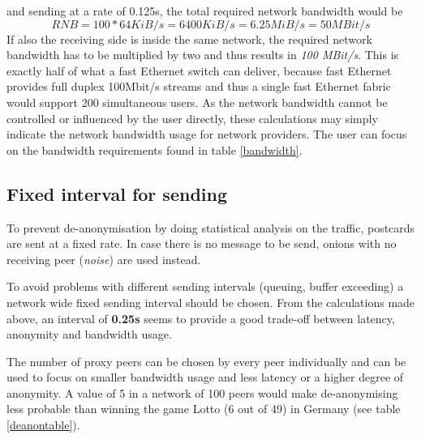 and sending at a rate of 0.125s, the total required network bandwidth would be
$$RNB = 100 * 64 KiB/s = 6400 KiB/s = 6.25MiB/s = 50 MBit/s$$
If also the receiving side is inside the same network, the required network
bandwidth has to be multiplied by two and thus results in 
\textit{100 MBit/s}. This is exactly half of what a fast Ethernet switch
can deliver, because fast Ethernet provides full duplex 100Mbit/s streams
and thus a single fast Ethernet fabric would support 200 simultaneous users.
As the network bandwidth cannot be controlled or influenced by the user
directly, these calculations may simply indicate the network bandwidth
usage for network providers. The user can focus on the bandwidth requirements
found in table \ref{bandwidth}.
\subsection{Fixed interval for sending}
To prevent de-anonymisation by doing statistical analysis on the traffic,
postcards are sent at a fixed rate.
In case there is no message to be send, onions with no receiving
peer (\textit{noise}) are used instead.

To avoid problems with different sending intervals
(queuing, buffer exceeding) a network wide fixed sending interval
should be chosen. From the calculations made above, an interval
of \textbf{0.25s} seems to provide a good trade-off between
latency, anonymity and bandwidth usage.

The number of proxy peers can be chosen by every peer individually
and can be used to focus on smaller bandwidth usage and less latency
or a higher degree of anonymity. A value of 5 in a network of 100 peers
would make de-anonymising less probable than winning the game
Lotto (6 out of 49) in Germany (see table \ref{deanontable}).

